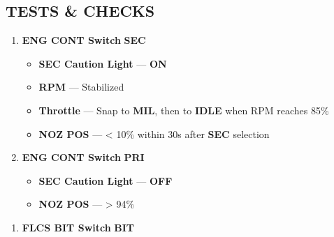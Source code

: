 

\clearpage

\subsection{TESTS \& CHECKS}
\label{subsec:testschecks}
\begin{checklistenumerate}
    \begin{enumerate}
        \item \textbf{ENG CONT Switch} \dotfill \textbf{SEC}
        \begin{itemize}
            \item \textbf{SEC Caution Light} --- \textbf{ON}
            \item \textbf{RPM} --- Stabilized
            \item \textbf{Throttle} --- Snap to \textbf{MIL}, then to \textbf{IDLE} when RPM reaches 85\% 
            \item \textbf{NOZ POS} --- < 10\% within 30s after \textbf{SEC} selection
        \end{itemize}
        \item \textbf{ENG CONT Switch} \dotfill \textbf{PRI}
        \begin{itemize}
            \item \textbf{SEC Caution Light} --- \textbf{OFF}
            \item \textbf{NOZ POS} --- > 94\% 
        \end{itemize}
    \end{enumerate}
    \begin{enumerate}
        \item \textbf{FLCS BIT Switch} \dotfill \textbf{BIT}

\end{enumerate}
\end{checklistenumerate}
